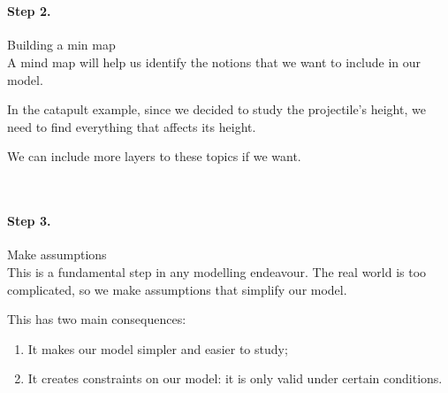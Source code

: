 \hfill \\

\paragraph{Step 2.} Building a min map \\

A mind map will help us identify the notions that we want to include in our model.


\begin{example}

In the catapult example, since we decided to study the projectile's height, we need to find everything that affects its height.

\begin{center}
\end{center}

We can include more layers to these topics if we want.

\end{example}


\hfill \\

\paragraph{Step 3.} Make assumptions \\

This is a fundamental step in any modelling endeavour. The real world is too complicated, so we make assumptions that simplify our model.

This has two main consequences:
\begin{enumerate}
	\item It makes our model simpler and easier to study;
	\item It creates constraints on our model: it is only valid under certain conditions.
\end{enumerate}

